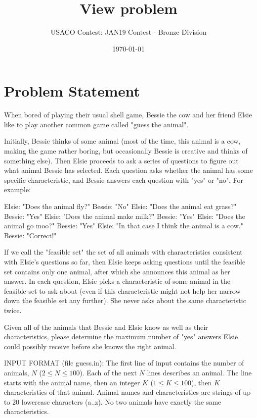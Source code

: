 \documentclass[12pt]{article}
\title{View problem}
\author{USACO Contest: JAN19 Contest - Bronze Division}
\date{\today}
\begin{document}
\maketitle

\section*{Problem Statement}

When bored of playing their usual shell game, Bessie the cow and her friend
Elsie like to play another common game called "guess the animal".

Initially, Bessie thinks of some animal (most of the time, this animal is a cow,
making the game rather boring, but occasionally Bessie is  creative and thinks
of something else).  Then Elsie proceeds to ask a series of questions to figure
out what animal Bessie has selected.  Each question asks whether the animal has
some specific characteristic, and Bessie answers each question with "yes" or
"no". For example:


Elsie: "Does the animal fly?" 
Bessie: "No" 
Elsie: "Does the animal eat grass?" 
Bessie: "Yes" 
Elsie: "Does the animal make milk?"
Bessie: "Yes" 
Elsie: "Does the animal go moo?"
Bessie: "Yes" 
Elsie: "In that case I think the animal is a cow." 
Bessie: "Correct!"

If we call the "feasible set" the set of all animals with characteristics
consistent with Elsie's questions so far, then Elsie keeps asking questions
until the feasible set contains only one animal, after which she announces this
animal as her answer.  In each question, Elsie picks a characteristic of some
animal in the feasible set to ask about (even if this characteristic might not
help her narrow down the feasible set any further).  She never asks about the
same  characteristic twice.

Given all of the animals that Bessie and Elsie know as well as their 
characteristics, please determine the maximum number of "yes" answers  Elsie
could possibly receive before she knows the right animal.

INPUT FORMAT (file guess.in):
The first line of input contains the number of animals, $N$
($2 \leq N \leq 100$).   Each of the next $N$ lines describes an animal.  The
line starts with the animal name,  then an integer $K$ ($1 \leq K \leq 100$),
then $K$ characteristics of that animal. Animal names and characteristics are
strings of up to 20 lowercase characters (a..z).  No two animals have  exactly
the same characteristics.
\end{document}
